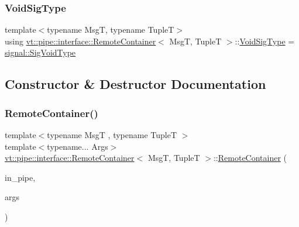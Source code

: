 \mbox{\label{structvt_1_1pipe_1_1interface_1_1_remote_container_a04acc410a9a9da0ec211043db91b7559}} 
\subsubsection{\texorpdfstring{Void\+Sig\+Type}{VoidSigType}}
{\footnotesize\ttfamily template$<$typename MsgT, typename TupleT$>$ \\
using \hyperlink{structvt_1_1pipe_1_1interface_1_1_remote_container}{vt\+::pipe\+::interface\+::\+Remote\+Container}$<$ MsgT, TupleT $>$\+::\hyperlink{structvt_1_1pipe_1_1interface_1_1_remote_container_a04acc410a9a9da0ec211043db91b7559}{Void\+Sig\+Type} =  \hyperlink{namespacevt_1_1pipe_1_1signal_acbe257d1ae44f20fa9fd9b6ed3057caf}{signal\+::\+Sig\+Void\+Type}}



\subsection{Constructor \& Destructor Documentation}
\mbox{\label{structvt_1_1pipe_1_1interface_1_1_remote_container_a5bb09812f8bb6778051d9cc6b4662dc5}} 
\subsubsection{\texorpdfstring{Remote\+Container()}{RemoteContainer()}\hspace{0.1cm}{\footnotesize\ttfamily [1/2]}}
{\footnotesize\ttfamily template$<$typename MsgT , typename TupleT $>$ \\
template$<$typename... Args$>$ \\
\hyperlink{structvt_1_1pipe_1_1interface_1_1_remote_container}{vt\+::pipe\+::interface\+::\+Remote\+Container}$<$ MsgT, TupleT $>$\+::\hyperlink{structvt_1_1pipe_1_1interface_1_1_remote_container}{Remote\+Container} (\begin{DoxyParamCaption}\item[{\hyperlink{namespacevt_ac9852acda74d1896f48f406cd72c7bd3}{Pipe\+Type} const \&}]{in\+\_\+pipe,  }\item[{Args...}]{args }\end{DoxyParamCaption})\hspace{0.3cm}{\ttfamily [explicit]}}

